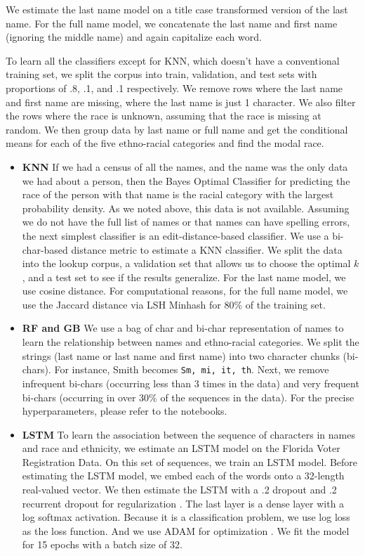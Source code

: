 \documentclass[12pt, letterpaper]{article}
\begin{document}
We estimate the last name model on a title case transformed version of the last name. For the full name model, we concatenate the last name and first name (ignoring the middle name) and again capitalize each word. 

To learn all the classifiers except for KNN, which doesn't have a conventional training set, we split the corpus into train, validation, and test sets with proportions of .8, .1, and .1 respectively. We remove rows where the last name and first name are missing, where the last name is just 1 character. We also filter the rows where the race is unknown, assuming that the race is missing at random. We then group data by last name or full name and get the conditional means for each of the five ethno-racial categories and find the modal race. 

\begin{itemize}

    \item \textbf{KNN} If we had a census of all the names, and the name was the only data we had about a person, then the Bayes Optimal Classifier for predicting the race of the person with that name is the racial category with the largest probability density. As we noted above, this data is not available. Assuming we do not have the full list of names or that names can have spelling errors, the next simplest classifier is an edit-distance-based classifier. We use a bi-char-based distance metric to estimate a KNN classifier. We split the data into the lookup corpus, a validation set that allows us to choose the optimal $k$, and a test set to see if the results generalize. For the last name model, we use cosine distance. For computational reasons, for the full name model, we use the Jaccard distance via LSH Minhash for 80\% of the training set.

    \item \textbf{RF and GB} We use a bag of char and bi-char representation of names to learn the relationship between names and ethno-racial categories. We split the strings (last name or last name and first name) into two character chunks (bi-chars). For instance, Smith becomes {\tt Sm, mi, it, th}. Next, we remove infrequent bi-chars (occurring less than 3 times in the data) and very frequent bi-chars (occurring in over 30\% of the sequences in the data). For the precise hyperparameters, please refer to the notebooks.
    
    \item \textbf{LSTM} To learn the association between the sequence of characters in names and race and ethnicity, we estimate an LSTM model \citep{graves2005framewise, gers1999learning} on the Florida Voter Registration Data. On this set of sequences, we train an LSTM model. Before estimating the LSTM model, we embed each of the words onto a 32-length real-valued vector. We then estimate the LSTM with a .2 dropout and .2 recurrent dropout for regularization \citep{srivastava2014dropout}. The last layer is a dense layer with a log softmax activation. Because it is a classification problem, we use log loss as the loss function. And we use ADAM for optimization \citep{kingma2014adam}. We fit the model for 15 epochs with a batch size of 32.
    \end{itemize}
\end{document}
